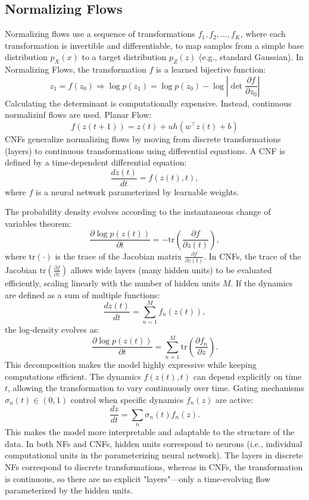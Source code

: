 \documentclass[12pt]{article}
\begin{document}
\subsection{Normalizing Flows}
Normalizing flows use a sequence of transformations \(f_1, f_2, \ldots, f_K\), where each transformation is invertible and differentiable, to map samples from a simple base distribution \(p_X(x)\) to a target distribution \(p_Z(z)\) (e.g., standard Gaussian).
In Normalizing Flows, the transformation $f$ is a learned bijective function:
\[
    z_1 = f(z_0) \Rightarrow \log p(z_1) = \log p(z_0) - \log \left| \det \frac{\partial f}{\partial z_0} \right|
\]
Calculating the determinant is computationally expensive. Instead, continuous normalizinf flows are used. Planar Flow:
\[
    f(z(t+1)) = z(t) + uh(w^\top z(t) + b)
\]
CNFs generalize normalizing flows by moving from discrete transformations (layers) to continuous transformations using differential equations. 
A CNF is defined by a time-dependent differential equation:
\[
\frac{dz(t)}{dt} = f(z(t), t),
\]
where \( f \) is a neural network parameterized by learnable weights.

The probability density evolves according to the instantaneous change of variables theorem:
\[
\frac{\partial \log p(z(t))}{\partial t} = -\mathrm{tr}\left(\frac{\partial f}{\partial z(t)}\right),
\]
where \(\mathrm{tr}(\cdot)\) is the trace of the Jacobian matrix \(\frac{\partial f}{\partial z(t)}\). 
In CNFs, the trace of the Jacobian \(\mathrm{tr}\left(\frac{\partial f}{\partial z}\right)\) allows wide layers (many hidden units) to be evaluated efficiently, scaling linearly with the number of hidden units \(M\).
If the dynamics are defined as a sum of multiple functions:
\[
\frac{dz(t)}{dt} = \sum_{n=1}^{M} f_n(z(t)),
\]
the log-density evolves as:
\[
\frac{\partial \log p(z(t))}{\partial t} = \sum_{n=1}^{M} \mathrm{tr}\left(\frac{\partial f_n}{\partial z}\right).
\]
This decomposition makes the model highly expressive while keeping computations efficient.
The dynamics \(f(z(t), t)\) can depend explicitly on time \(t\), allowing the transformation to vary continuously over time.
Gating mechanisms \(\sigma_n(t) \in (0, 1)\) control when specific dynamics \(f_n(z)\) are active:
\[
\frac{dz}{dt} = \sum_{n} \sigma_n(t) f_n(z).
\]
This makes the model more interpretable and adaptable to the structure of the data. In both NFs and CNFs, hidden units correspond to neurons (i.e., individual computational units in the parameterizing neural network).
The layers in discrete NFs correspond to discrete transformations, whereas in CNFs, the transformation is continuous, so there are no explicit "layers"—only a time-evolving flow parameterized by the hidden units.
\end{document}
